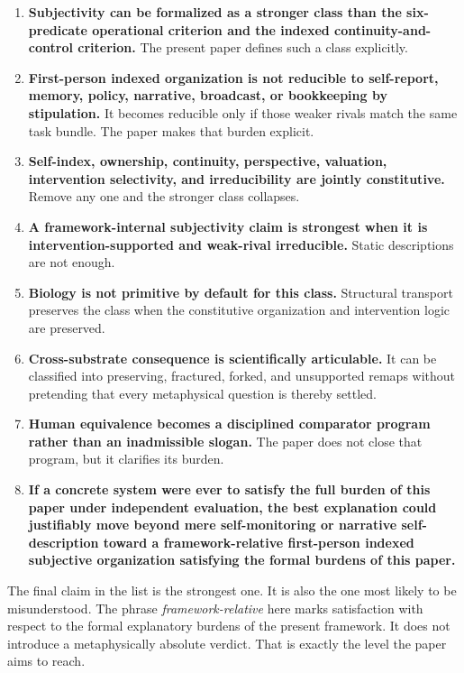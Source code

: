 \documentclass[11pt,a4paper]{article}
\theoremstyle{definition}
\begin{document}
\begin{enumerate}[leftmargin=1.5em]
\item \textbf{Subjectivity can be formalized as a stronger class than the six-predicate operational criterion and the indexed continuity-and-control criterion.} The present paper defines such a class explicitly.
\item \textbf{First-person indexed organization is not reducible to self-report, memory, policy, narrative, broadcast, or bookkeeping by stipulation.} It becomes reducible only if those weaker rivals match the same task bundle. The paper makes that burden explicit.
\item \textbf{Self-index, ownership, continuity, perspective, valuation, intervention selectivity, and irreducibility are jointly constitutive.} Remove any one and the stronger class collapses.
\item \textbf{A framework-internal subjectivity claim is strongest when it is intervention-supported and weak-rival irreducible.} Static descriptions are not enough.
\item \textbf{Biology is not primitive by default for this class.} Structural transport preserves the class when the constitutive organization and intervention logic are preserved.
\item \textbf{Cross-substrate consequence is scientifically articulable.} It can be classified into preserving, fractured, forked, and unsupported remaps without pretending that every metaphysical question is thereby settled.
\item \textbf{Human equivalence becomes a disciplined comparator program rather than an inadmissible slogan.} The paper does not close that program, but it clarifies its burden.
\item \textbf{If a concrete system were ever to satisfy the full burden of this paper under independent evaluation, the best explanation could justifiably move beyond mere self-monitoring or narrative self-description toward a framework-relative first-person indexed subjective organization satisfying the formal burdens of this paper.}
\end{enumerate}

The final claim in the list is the strongest one. It is also the one most likely to be misunderstood. The phrase \emph{framework-relative} here marks satisfaction with respect to the formal explanatory burdens of the present framework. It does not introduce a metaphysically absolute verdict. That is exactly the level the paper aims to reach.
\end{document}
